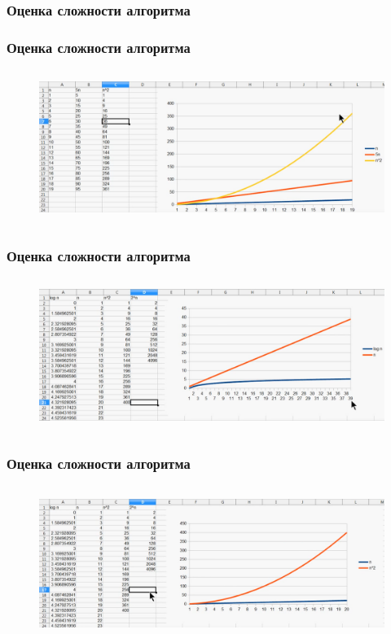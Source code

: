 \documentclass[russian, 12pt]{beamer}
\begin{document}
\lstset{style=mystyle}
\begin{frame}
\frametitle{Оценка сложности алгоритма}

\end{frame}
\begin{frame}
\frametitle{Оценка сложности алгоритма}
\begin{figure}
  \includegraphics[width=\linewidth, height=5cm]{img/scal_1.png}
\end{figure}
\end{frame}
\begin{frame}
\frametitle{Оценка сложности алгоритма}
\begin{figure}
  \includegraphics[width=\linewidth, height=5cm]{img/scal_2.png}
\end{figure}
\end{frame}
\begin{frame}
\frametitle{Оценка сложности алгоритма}
\begin{figure}
  \includegraphics[width=\linewidth, height=5cm]{img/scal_3.png}
\end{figure}
\end{frame}
\end{document}
